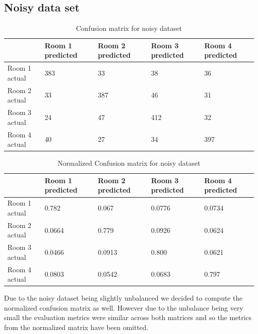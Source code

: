 \documentclass[a4paper, 11pt]{article}
\begin{document}
    \subsection{Noisy data set}
    \renewcommand{\arraystretch}{2}  
    \begin{table}[htb]
      \centering
      \begin{tabular}{|l|l|l|l|l|}
      \hline
                    & Room 1 predicted & Room 2 predicted & Room 3 predicted & Room 4 predicted \\ \hline
      Room 1 actual & 383              & 33               & 38               & 36               \\ \hline
      Room 2 actual & 33               & 387              & 46               & 31               \\ \hline
      Room 3 actual & 24               & 47               & 412              & 32               \\ \hline
      Room 4 actual & 40               & 27               & 34               & 397              \\ \hline
      \end{tabular}
      \caption{Confusion matrix for noisy dataset}
    \end{table}
    \renewcommand{\arraystretch}{2}  
    \begin{table}[htb]
      \centering
      \begin{tabular}{|l|l|l|l|l|}
      \hline
                    & Room 1 predicted & Room 2 predicted & Room 3 predicted & Room 4 predicted \\ \hline
      Room 1 actual & 0.782              & 0.067               & 0.0776               & 0.0734               \\ \hline
      Room 2 actual & 0.0664               & 0.779              & 0.0926               & 0.0624               \\ \hline
      Room 3 actual & 0.0466               & 0.0913               & 0.800              & 0.0621               \\ \hline
      Room 4 actual & 0.0803               & 0.0542               & 0.0683               & 0.797              \\ \hline
      \end{tabular}
      \caption{Normalized Confusion matrix for noisy dataset}
    \end{table}
    Due to the noisy dataset being slightly unbalanced we decided to compute the normalized confusion matrix as well. However due to the unbalance being very small the evaluation metrics were similar across both matrices and so the metrics from the normalized matrix have been omitted.
\end{document}
